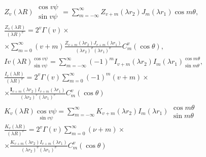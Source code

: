 \documentclass[10pt]{article}
\begin{document}
\[

\begin{aligned}

& Z_{v}(\lambda R) \begin{array}{l}

\cos v \psi \\

\sin v \psi

\end{array}=\sum_{m=-\infty}^{\infty} Z_{v+m}\left(\lambda r_{2}\right) J_{m}\left(\lambda r_{1}\right) \cos m \theta, \\

& \frac{Z_{v}(\lambda R)}{(\lambda R)^{v}}=2^{v} \Gamma(v) \times \\

& \times \sum_{m=0}^{\infty}(v+m) \frac{Z_{v+m}\left(\lambda r_{2}\right) J_{v+m}\left(\lambda r_{1}\right)}{\left(\lambda r_{2}\right)^{v}\left(\lambda r_{1}\right)^{v}} C_{m}^{v}(\cos \theta), \\

& I v(\lambda R)_{\sin v \psi}^{\cos v \psi}=\sum_{m=-\infty}^{\infty}(-1)^{m} I_{v+m}\left(\lambda r_{2}\right) I_{m}\left(\lambda r_{1}\right)_{\sin m \theta}^{\cos m \theta}, \\

& \frac{I_{v}(\lambda R)}{(\lambda R)^{v}}=2^{v} \Gamma(v) \sum_{m=0}^{\infty}(-1)^{m}(v+m) \times \\

& \times \frac{\boldsymbol{I}_{v+m}\left(\lambda r_{2}\right) I_{v+m}\left(\lambda r_{1}\right)}{\left(\lambda r_{2}\right)^{v}\left(\lambda r_{1}\right)^{v}} C_{m}^{v}(\cos \theta) \\

& K_{v}(\lambda R) \underset{\sin v \psi}{\cos v \psi}=\sum_{m=-\infty}^{\infty} K_{v+m}\left(\lambda r_{2}\right) I_{m}\left(\lambda r_{1}\right) \begin{array}{l}

\cos m \theta \\

\sin m \theta

\end{array} \\

& \frac{K_{v}(\lambda R)}{(\lambda R)^{v}}=2^{v} \Gamma(v) \sum_{m=0}^{\infty}(\nu+m) \times \\

& \times \frac{K_{v+m}\left(\lambda r_{2}\right) I_{v+m}\left(\lambda r_{1}\right)}{\left(\lambda r_{2}\right)^{v}\left(\lambda r_{1}\right)^{v}} C_{m}^{v}(\cos \theta) \\


\end{aligned}\]
\end{document}
